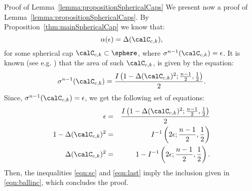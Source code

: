 \begin{section}{Proof of Lemma~\ref{lemma:propositionSphericalCaps}}
We present now a proof of Lemma~\ref{lemma:propositionSphericalCaps}. By Proposition~\ref{thm:mainSphericalCap} we know that:
\begin{equation}\label{eqn:sc}\alpha(\epsilon) = \Delta(\calC_{c, k}),
\end{equation}
for some spherical cap $\calC_{c,k} \subset \sphere$, where  $\sigma^{n-1}(\calC_{c, k}) = \epsilon$. It is known (see e.g. \cite{sphericalCapRef}) that the area of such $\calC_{c, k}$, is given by the equation:
\begin{equation}\sigma^{n-1}(\calC_{c, k}) = \frac{I\left(1-\Delta(\calC_{c,k})^2; \frac{n-1}{2}, \frac{1}{2}\right)}{2}.
\end{equation}
Since, \mbox{$\sigma^{n-1}(\calC_{c, k})= \epsilon$,} we get the following set of equations:
\begin{eqnarray}\nonumber \epsilon &=& \frac{I\left(1- \Delta(\calC_{c,k})^2;\frac{n-1}{2}, \frac{1}{2}\right)}{2} \\
\nonumber 1- \Delta(\calC_{c, k})^2 &=&  I^{-1}\left(2\epsilon; \frac{n-1}{2}, \frac{1}{2}\right) \\
\label{eqn:last}\Delta(\calC_{c, k})^2 &=&  1- I^{-1}\left(2\epsilon; \frac{n-1}{2}, \frac{1}{2}\right).
\end{eqnarray}
Then, the inequalities \eqref{eqn:sc} and \eqref{eqn:last} imply the inclusion given in \eqref{eqn:ballinc}, which concludes the proof.


\end{section}


